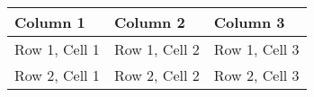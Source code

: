 \documentclass[a4paper]{article}
\begin{document}
\begin{tabular}{|l|l|l|}
\hline
Column 1 & Column 2 & Column 3 \\
\hline
Row 1, Cell 1 & Row 1, Cell 2 & Row 1, Cell 3 \\
\hline
Row 2, Cell 1 & Row 2, Cell 2 & Row 2, Cell 3 \\
\hline
\end{tabular}
\end{document}
